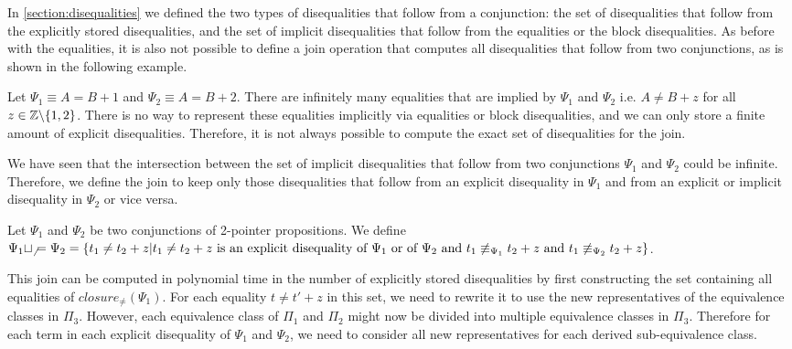 In \cref{section:disequalities} we defined the two types of disequalities that follow from a conjunction:
the set of disequalities that follow from the explicitly stored disequalities,
and the set of implicit disequalities that follow from the equalities or the block disequalities.
As before with the equalities, it is also not possible to define a join operation that computes all disequalities that follow from two conjunctions, as is shown in the following example.

\begin{example}
    Let $\Psi_1 \equiv A = B + 1$ and $\Psi_2 \equiv A = B + 2$. There are infinitely many equalities that are implied by $\Psi_1$ and $\Psi_2$ i.e. $A \neq B + z$ for all $z \in \mathbb{Z} \backslash \{1,2\}$.
    There is no way to represent these equalities implicitly via equalities or block disequalities, and we can only store a finite amount of explicit disequalities. Therefore, it is not always possible to compute the exact set of disequalities for the join.
\end{example}

We have seen that the intersection between the set of implicit disequalities that follow from two conjunctions $\Psi_1$ and $\Psi_2$ could be infinite.
Therefore, we define the join to keep only those disequalities that follow from an explicit disequality in $\Psi_1$ and from an explicit or implicit disequality in $\Psi_2$ or vice versa.

\begin{definition}
    Let $\Psi_1$ and $\Psi_2$ be two conjunctions of 2-pointer propositions. We define $\Psi_1 \sqcup_\neq \Psi_2 = \{t_1 \neq t_2 + z | t_1 \neq t_2 + z \text{ is an explicit disequality of } \Psi_1 \text{ or of } \Psi_2 \text{ and } t_1 \not\equiv_{\Psi_1} t_2 + z \text{ and } t_1 \not\equiv_{\Psi_2} t_2 + z\}$.
\end{definition}

This join can be computed in polynomial time in the number of explicitly stored disequalities by first constructing the set containing all equalities of $closure_\neq(\Psi_1)$.
For each equality $t \neq t' + z$ in this set, we need to rewrite it to use the new representatives of the equivalence classes in $\Pi_3$.
However, each equivalence class of $\Pi_1$ and $\Pi_2$ might now be divided into multiple equivalence classes in $\Pi_3$.
Therefore for each term in each explicit disequality of $\Psi_1$ and $\Psi_2$, we need to consider all new representatives for each derived sub-equivalence class.


